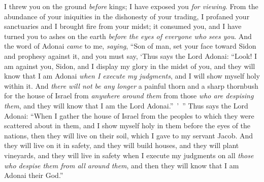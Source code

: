 \begin{biblechapter}
I threw you on the ground \textit{before} kings; 
I have exposed you \textit{for viewing}.
\verse From the abundance of your iniquities 
in the dishonesty of your trading, 
I profaned your sanctuaries 
and I brought fire from your midst; 
it consumed you, and I have turned you to ashes on the earth 
\textit{before the eyes of everyone who sees you}.
\verse And the word of Adonai \textit{came} to me, \textit{saying},
\verse “Son of man, set your face toward Sidon and prophesy against it,
\verse and you must say, ‘Thus says the Lord Adonai:
\verse “Look! I am against you, Sidon, 
and I display my glory in the midst of you, 
and they will know that I am Adonai 
\textit{when I execute my judgments}, 
and I will show myself holy within it.
\verse And \textit{there will not be any longer} a painful thorn and a sharp thornbush for the house of Israel from \textit{anywhere around them} from those \textit{who are despising them}, and they will know that I am the Lord Adonai.” ’ ”
\verse Thus says the Lord Adonai: “When I gather the house of Israel from the peoples to which they were scattered about in them, and I show myself holy in them before the eyes of the nations, then they will live on their soil, which I gave to my servant Jacob.
\verse And they will live on it in safety, and they will build houses, and they will plant vineyards, and they will live in safety when I execute my judgments on all \textit{those who despise them from all around them}, and then they will know that I am Adonai their God.”
\end{biblechapter}

